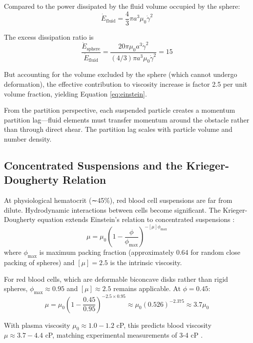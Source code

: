 Compared to the power dissipated by the fluid volume occupied by the sphere:
\begin{equation}
\dot{E}_{\mathrm{fluid}} = \frac{4}{3}\pi a^{3} \mu_{0} \dot{\gamma}^{2}
\end{equation}

The excess dissipation ratio is
\begin{equation}
\frac{\dot{E}_{\mathrm{sphere}}}{\dot{E}_{\mathrm{fluid}}} = \frac{20\pi \mu_{0} a^{3} \dot{\gamma}^{2}}{(4/3)\pi a^{3} \mu_{0} \dot{\gamma}^{2}} = 15
\end{equation}

But accounting for the volume excluded by the sphere (which cannot undergo deformation), the effective contribution to viscosity increase is factor 2.5 per unit volume fraction, yielding Equation \ref{eq:einstein}.

From the partition perspective, each suspended particle creates a momentum partition lag—fluid elements must transfer momentum around the obstacle rather than through direct shear. The partition lag scales with particle volume and number density.

\subsection{Concentrated Suspensions and the Krieger-Dougherty Relation}

At physiological hematocrit (∼45\%), red blood cell suspensions are far from dilute. Hydrodynamic interactions between cells become significant. The Krieger-Dougherty equation extends Einstein's relation to concentrated suspensions \cite{krieger1959mechanism}:
\begin{equation}
\mu = \mu_{0}\left(1 - \frac{\phi}{\phi_{\max}}\right)^{-[\mu]\phi_{\max}}
\end{equation}
where $\phi_{\max}$ is maximum packing fraction (approximately 0.64 for random close packing of spheres) and $[\mu] = 2.5$ is the intrinsic viscosity.

For red blood cells, which are deformable biconcave disks rather than rigid spheres, $\phi_{\max} \approx 0.95$ and $[\mu] \approx 2.5$ remains applicable. At $\phi = 0.45$:
\begin{equation}
\mu = \mu_{0}\left(1 - \frac{0.45}{0.95}\right)^{-2.5 \times 0.95} \approx \mu_{0}(0.526)^{-2.375} \approx 3.7\mu_{0}
\end{equation}

With plasma viscosity $\mu_{0} \approx 1.0-1.2$ cP, this predicts blood viscosity $\mu \approx 3.7-4.4$ cP, matching experimental measurements of 3-4 cP \cite{chien1970blood}.

